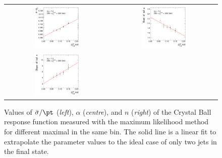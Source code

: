 \begin{figure}[ht]
  \centering
  \begin{tabular}{cc}
    \includegraphics[width=0.45\textwidth]{figures/ResFit_Spring10QCDFlat_CB_Eta0_ExtrapolatedPar0_PtBin4} &
    \includegraphics[width=0.45\textwidth]{figures/ResFit_Spring10QCDFlat_CB_Eta0_ExtrapolatedPar1_PtBin4} \\
    \includegraphics[width=0.45\textwidth]{figures/ResFit_Spring10QCDFlat_CB_Eta0_ExtrapolatedPar2_PtBin4} & \\
  \end{tabular}
\caption{Values of $\bar{\sigma}/\pt$ (\textit{left}), $\alpha$ (\textit{centre}), and $n$ (\textit{right}) of the Crystal Ball response function measured with the maximum likelihood method for different maximal \ptrel in the same \pt bin.
  The solid line is a linear fit to extrapolate the parameter values to the ideal case of only two jets in the final state.}
\label{fig:ResFit:QCDMC:Extrapolation:CB:ExBin:Extrapolation}
\end{figure}

